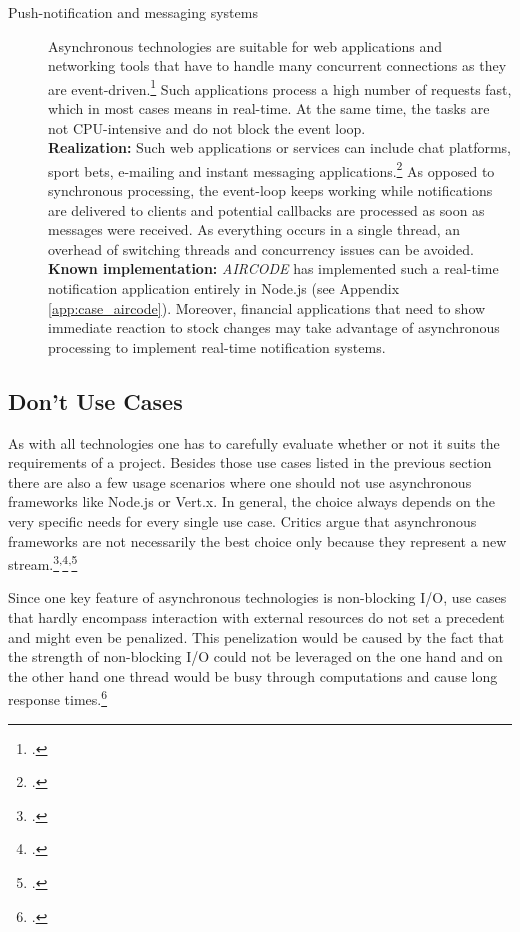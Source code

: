 \begin{description}
\item[Push-notification and messaging systems] Asynchronous technologies are
suitable for web applications and networking tools that have to handle many
concurrent connections as they are event-driven.\footcite[Cf.][17]{teixeira_2012} Such applications process a
high number of requests fast, which in most cases means in real-time. At the
same time, the tasks are not CPU-intensive and do not block the event loop. \\
\textbf{Realization:} Such web applications or services can include chat
platforms, sport bets, e-mailing and instant messaging
applications.\footcite[Cf.][]{GeisendoerferF_2011} As opposed to synchronous
processing, the event-loop keeps working while notifications are delivered to
clients and potential callbacks are processed as soon as messages were received.
As everything occurs in a single thread, an overhead of switching threads and
concurrency issues can be avoided.\\
\textbf{Known implementation:} \textit{AIRCODE} has implemented such a real-time
notification application entirely in Node.js (see Appendix \ref{app:case_aircode}). Moreover,
financial applications that need to show immediate reaction to stock
changes may take advantage of asynchronous processing to implement real-time notification systems.

\end{description}



\subsection{Don't Use Cases}
\label{dont_use_cases}

As with all technologies one has to carefully evaluate whether or not it suits the
requirements of a project. Besides those use cases listed in the previous
section there are also a few usage scenarios where one should not use
asynchronous frameworks like Node.js or Vert.x. In general, the choice
always depends on the very specific needs for every single use case.
Critics argue that asynchronous frameworks are not necessarily the best choice
only because they represent a new stream.\footcite[Cf.][]{semerau_2011}\textsuperscript{,}\footcite[Cf.][]{arranz_2011}\textsuperscript{,}\footcite[Cf.][]{behren_2003}

Since one key feature of asynchronous technologies is non-blocking I/O, use
cases that hardly encompass interaction with external resources do not set a
precedent and might even be penalized. This penelization would be caused by the
fact that the strength of non-blocking I/O could not be leveraged on the one
hand and on the other hand one thread would be busy through computations and
cause long response times.\footcite[Cf.][14]{Roden_2012}

